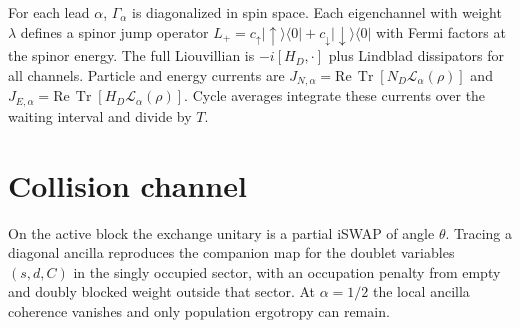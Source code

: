 \documentclass[aps,pre,twocolumn,floatfix,groupedaddress,amsmath,amssymb,nofootinbib]{revtex4-2}
\newcommand{\ket}[1]{\lvert #1\rangle}
\newcommand{\bra}[1]{\langle #1\rvert}
\newcommand{\Tr}{\operatorname{Tr}}
\begin{document}
For each lead $\alpha$, $\Gamma_\alpha$ is diagonalized in spin space. Each
eigenchannel with weight $\lambda$ defines a spinor jump operator
$L_+=c_\uparrow\ket{\uparrow}\bra{0}+c_\downarrow\ket{\downarrow}\bra{0}$
with Fermi factors at the spinor energy. The full Liouvillian is
$-i[H_D,\cdot]$ plus Lindblad dissipators for all channels. Particle and
energy currents are
$J_{N,\alpha}=\mathrm{Re}\,\Tr[N_D\mathcal L_\alpha(\rho)]$ and
$J_{E,\alpha}=\mathrm{Re}\,\Tr[H_D\mathcal L_\alpha(\rho)]$. Cycle averages
integrate these currents over the waiting interval and divide by $T$.

\section{Collision channel}

On the active block the exchange unitary is a partial iSWAP of angle
$\theta$. Tracing a diagonal ancilla reproduces the companion map for the
doublet variables $(s,d,C)$ in the singly occupied sector, with an
occupation penalty from empty and doubly blocked weight outside that sector.
At $\alpha=1/2$ the local ancilla coherence vanishes and only population
ergotropy can remain.


\end{document}
